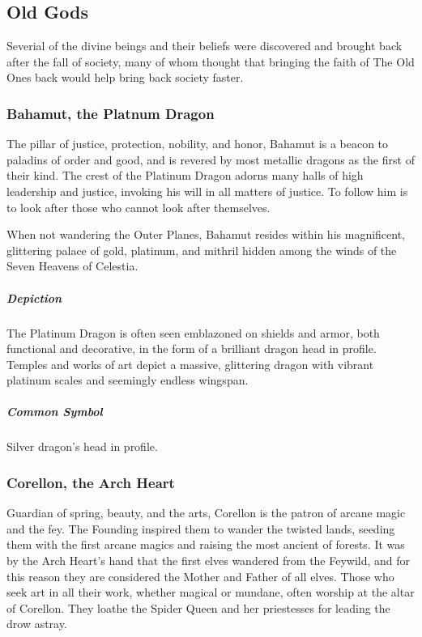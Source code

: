 \documentclass[letterpaper, twocolumn, openany, nodeprecatedcode, layout=true]{dndbook}
\begin{document}
\subsection{Old Gods}

Severial of the divine beings and their beliefs were discovered and brought back after the
fall of society, many of whom thought that bringing the faith of The Old Ones back would
help bring back society faster.

\subsubsection{Bahamut, the Platnum Dragon}

The pillar of justice, protection, nobility, and honor, Bahamut is a beacon to
paladins of order and good, and is revered by most metallic dragons as the first of
their kind. The crest of the Platinum Dragon adorns many halls of high leadership and
justice, invoking his will in all matters of justice. To follow him is to look after
those who cannot look after themselves.

When not wandering the Outer Planes, Bahamut resides within his magnificent, glittering
palace of gold, platinum, and mithril hidden among the winds of the Seven Heavens of Celestia.

\subparagraph{Depiction}
The Platinum Dragon is often seen emblazoned on shields and armor, both functional and
decorative, in the form of a brilliant dragon head in profile. Temples and works of art
depict a massive, glittering dragon with vibrant platinum scales and seemingly
endless wingspan.

\subparagraph{Common Symbol}
Silver dragon’s head in profile.

\subsubsection{Corellon, the Arch Heart}

Guardian of spring, beauty, and the arts, Corellon is the patron of arcane magic and
the fey. The Founding inspired them to wander the twisted lands, seeding them with the
first arcane magics and raising the most ancient of forests. It was by the Arch Heart’s
hand that the first elves wandered from the Feywild, and for this reason they are
considered the Mother and Father of all elves. Those who seek art in all their work,
whether magical or mundane, often worship at the altar of Corellon. They loathe the
Spider Queen and her priestesses for leading the drow astray.
\end{document}
